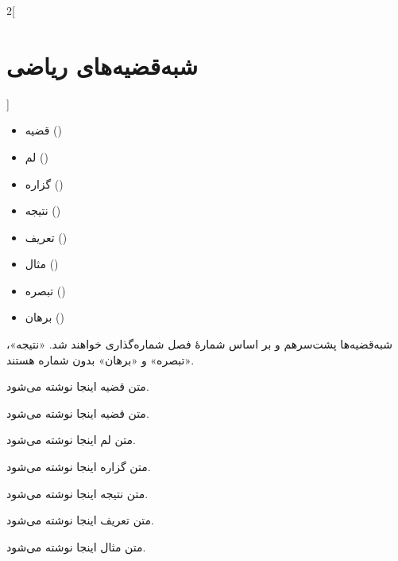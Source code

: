 \begin{code}[!htb]
	{\latin
		
	}
	\caption{نمونه کد
		}
	\label{mat:example}
\end{code}


\begin{multicols}{2}[\section{شبه‌قضیه‌های ریاضی}]
	\begin{itemize}
		\item
		قضیه
		()
		\item
		لم
		()
		\item
		گزاره
		()
		\item
		نتیجه
		()
		\item
		تعریف
		()
		\item
		مثال
		()
		\item
		تبصره
		()
		\item
		برهان
		()
	\end{itemize}
\end{multicols}
شبه‌قضیه‌ها پشت‌سرهم و بر اساس شمارهٔ فصل شماره‌گذاری خواهند شد. «نتیجه»، «تبصره»
و «برهان» بدون شماره هستند.

\begin{thm}
	متن قضیه اینجا نوشته می‌شود.
\end{thm}

\begin{thm}
متن قضیه اینجا نوشته می‌شود.
\end{thm}

\begin{lem}
متن لم اینجا نوشته می‌شود.
\end{lem}

\begin{prop}
متن گزاره اینجا نوشته می‌شود.
\end{prop}

\begin{cor}
متن نتیجه اینجا نوشته می‌شود.
\end{cor}

\begin{defn}
متن تعریف اینجا نوشته می‌شود.
\end{defn}

\begin{exmp}
متن مثال اینجا نوشته می‌شود.
\end{exmp}

